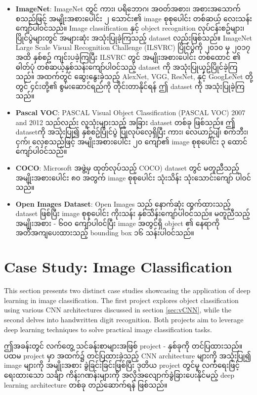 \begin{itemize}[b] 
\item \textbf{ImageNet}:  ImageNet \cite{web:ILSVRC} တွင် ကား၊ ပရိဘောဂ၊ အ၀တ်အစား၊ အစားအသောက် စသည်ဖြင့် အမျိုးအစားပေါင်း ၂ သောင်း၏ image စုစုပေါင်း တစ်ဆယ့် လေးသန်းကျော်ပါ၀င်သည်။ Image classification နှင့် object recognition လုပ်ငန်းစဥ်များ၊ပြိုင်ပွဲများတွင် အများဆုံး အသုံးပြုခဲ့ကြသည့် dataset လည်းဖြစ်သည်။ ImageNet Large Scale Visual Recognition Challenge (ILSVRC)  ပြိုင်ပွဲကို ၂၀၁၀ မှ ၂၀၁၇ အထိ နှစ်စဥ် ကျင်းပခဲ့ကြပြီး ILSVRC တွင် အမျိုးအစားပေါင်း တစ်ထောင် ၏ ဓါတ်ပုံ တစ်ဆယ့်နှစ်သန်းကျော်ပါ၀င်သည့်  dataset ကို အသုံးပြုယှဥ်ပြိုင်ခဲ့ကြသည်။ အထက်တွင် ဆွေးနွေးခဲ့သည့် AlexNet, VGG, ResNet, နှင့် GoogLeNet တို့တွင် ၄င်းတို့၏ စွမ်းဆောင်ရည်ကို တိုင်းတာနိုင်ရန် ဤ dataset ကို အသုံးပြုခဲ့ကြသည်။ 
    \item \textbf{Pascal VOC}: PASCAL Visual Object Classification (PASCAL VOC) 2007 and 2012 \cite{web:Pascal} သည်လည်း လူသုံးများသည့် အခြား dataset တစ်ခု ဖြစ်သည်။ ဤ datasetကို အသုံးပြု၍ နှစ်စဥ်ပြိုင်ပွဲ ပြုလုပ်လေ့ရှိပြီး ကား၊ လေယာဥ်ပျံ၊ စက်ဘီး၊ ငှက်၊ လှေစသည်ဖြင့် အမျိုးအစားပေါင်း ၂၀ ကျော်၏  image စုစုပေါင်း ၃ ထောင်ကျော်ပါ၀င်သည်။ 
    \item \textbf{COCO}: Microsoft အဖွဲ့မှ ထုတ်လုပ်သည့် COCO) dataset \cite{web:CoCo}တွင် မတူညီသည့် အမျိုးအစားပေါင်း ၈၀ အတွက်   image စုစုပေါင်း သုံးသိန်း သုံးသောင်းကျော် ပါ၀င်သည်။ 
    \item \textbf{Open Images Dataset}: Open Images \cite{web:OpenImage} သည် နောက်ဆုံး ထွက်ထားသည့် dataset ဖြစ်ပြီး image စုစုပေါင်း ကိုးသန်း နှစ်သိန်းကျော်ပါ၀င်သည်။ မတူညီသည့် အမျိုးအစား - ၆၀၀ ကျော်ပါ၀င်ပြီး image အတွင်ရှိ object ၏ နေရာကို အတိအကျပေးထားသည့် bounding box ၁၆ သန်းပါ၀င်သည်။ 
\end{itemize}

\newpage
\section{Case Study: Image Classification}

This section presents two distinct case studies showcasing the application of deep learning in image classification. The first project explores object classification using various CNN architectures discussed in section \ref{sec:vCNN}, while the second delves into handwritten digit recognition. Both projects aim to leverage deep learning techniques to solve practical image classification tasks.

ဤအခန်းတွင် လက်တွေ့ သင်ခန်းစာများအဖြစ် project - နှစ်ခုကို တင်ပြထားသည်။ ပထမ project မှာ အထက်၌ တင်ပြထားခဲ့သည့် CNN architecture များကို အသုံးပြု၍ image များကို အမျိုးအစား ခွဲခြင်းခြင်းဖြစ်ပြီး ဒုတိယ project တွင်မူ လက်ရေးဖြင့် ရေးထားသော သင်္ချာ ကိန်းဂဏန်းများကို အလိုအလျောက်ခွဲခြားပေးနိုင်မည့် deep learning architecture တစ်ခု တည်ဆောက်ရန် ဖြစ်သည်။ 


